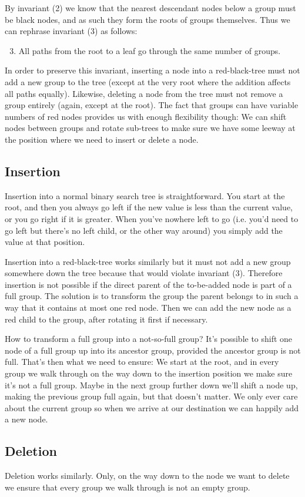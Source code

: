 \documentclass{article}
\begin{document}
By invariant (2) we know that the nearest descendant nodes below a group must be black
nodes, and as such they form the roots of groups themselves.  Thus we can rephrase
invariant (3) as follows:

\begin{enumerate}[label=(\arabic*)]
\setcounter{enumi}{2}
\item All paths from the root to a leaf go through the same number of groups.
\end{enumerate}

In order to preserve this invariant, inserting a node into a red-black-tree must not add
a new group to the tree (except at the very root where the addition affects all paths
equally). Likewise, deleting a node from the tree must not remove a group entirely
(again, except at the root). The fact that groups can have variable numbers of red nodes
provides us with enough flexibility though: We can shift nodes between groups and rotate
sub-trees to make sure we have some leeway at the position where we need to insert or
delete a node.

\subsection{Insertion}
Insertion into a normal binary search tree is straightforward. You start at the root,
and then you always go left if the new value is less than the current value, or you go
right if it is greater. When you've nowhere left to go (i.e. you'd need to go left but
there's no left child, or the other way around) you simply add the value at that
position.

Insertion into a red-black-tree works similarly but it must not add a new group
somewhere down the tree because that would violate invariant (3). Therefore insertion is
not possible if the direct parent of the to-be-added node is part of a full group. The
solution is to transform the group the parent belongs to in such a way that it contains
at most one red node. Then we can add the new node as a red child to the group, after
rotating it first if necessary.

How to transform a full group into a not-so-full group? It's possible to shift one
node of a full group up into its ancestor group, provided the ancestor group is not
full. That's then what we need to ensure: We start at the root, and in every group we
walk through on the way down to the insertion position we make sure it's not a full
group. Maybe in the next group further down we'll shift a node up, making the previous
group full again, but that doesn't matter. We only ever care about the current group so
when we arrive at our destination we can happily add a new node.

\subsection{Deletion}
Deletion works similarly. Only, on the way down to the node we want to delete we ensure
that every group we walk through is not an empty group.
\end{document}
